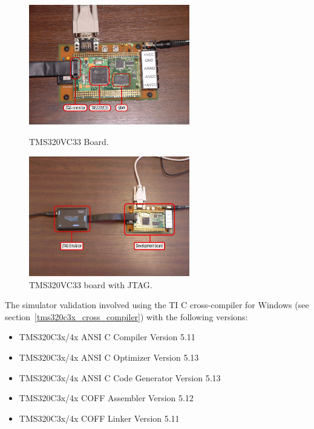 \begin{figure}[!h]
	\begin{center}
		\begin{minipage}{\textwidth}
			\begin{minipage}{8.0cm}
				\begin{center}
					\includegraphics[width=7.0cm]{tms320c3x/fig_tms320c3x_board.jpg}
					\caption{\label{fig:tms320c3x_board} TMS320VC33 Board.}
				\end{center}
			\end{minipage}
			\begin{minipage}{8.0cm}
				\begin{center}
					\includegraphics[width=7.0cm]{tms320c3x/fig_tms320c3x_dev_kit.jpg}
					\caption{\label{fig:tms320c3x_jtag_emu} TMS320VC33 board with JTAG.}
				\end{center}
			\end{minipage}
		\end{minipage}
	\end{center}
\end{figure}

The simulator validation involved using the TI C cross-compiler for Windows (see section~\ref{tms320c3x_cross_compiler}) with the following versions:
\begin{itemize}
\item TMS320C3x/4x ANSI C Compiler Version 5.11
\item TMS320C3x/4x ANSI C Optimizer Version 5.13
\item TMS320C3x/4x ANSI C Code Generator Version 5.13
\item TMS320C3x/4x COFF Assembler Version 5.12
\item TMS320C3x/4x COFF Linker Version 5.11
\end{itemize}

